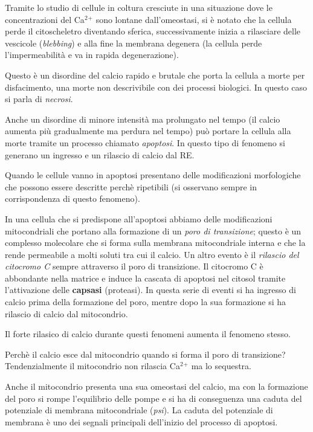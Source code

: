 \documentclass[]{article}
\begin{document}
Tramite lo studio di cellule in coltura cresciute in una situazione dove
le concentrazioni del Ca\(^2\)\(^+\) sono lontane dall'omeostasi, si è
notato che la cellula perde il citoscheletro diventando sferica,
successivamente inizia a rilasciare delle vescicole (\emph{blebbing}) e
alla fine la membrana degenera (la cellula perde l'impermeabilità e va
in rapida degenerazione).

Questo è un disordine del calcio rapido e brutale che porta la cellula a
morte per disfacimento, una morte non descrivibile con dei processi
biologici. In questo caso si parla di \emph{necrosi}.

Anche un disordine di minore intensità ma prolungato nel tempo (il
calcio aumenta più gradualmente ma perdura nel tempo) può portare la
cellula alla morte tramite un processo chiamato \emph{apoptosi}. In
questo tipo di fenomeno si generano un ingresso e un rilascio di calcio
dal RE.

Quando le cellule vanno in apoptosi presentano delle modificazioni
morfologiche che possono essere descritte perchè ripetibili (si
osservano sempre in corrispondenza di questo fenomeno).

In una cellula che si predispone all'apoptosi abbiamo delle
modificazioni mitocondriali che portano alla formazione di un \emph{poro
di transizione}; questo è un complesso molecolare che si forma sulla
membrana mitocondriale interna e che la rende permeabile a molti soluti
tra cui il calcio. Un altro evento è il \emph{rilascio del citocromo C}
sempre attraverso il poro di transizione. Il citocromo C è abbondante
nella matrice e induce la cascata di apoptosi nel citosol tramite
l'attivazione delle \textbf{capsasi} (proteasi). In questa serie di
eventi si ha ingresso di calcio prima della formazione del poro, mentre
dopo la sua formazione si ha rilascio di calcio dal mitocondrio.

Il forte rilasico di calcio durante questi fenomeni aumenta il fenomeno
stesso.

Perchè il calcio esce dal mitocondrio quando si forma il poro di
transizione? Tendenzialmente il mitocondrio non rilascia Ca\(^2\)\(^+\)
ma lo sequestra.

Anche il mitocondrio presenta una sua omeostasi del calcio, ma con la
formazione del poro si rompe l'equilibrio delle pompe e si ha di
conseguenza una caduta del potenziale di membrana mitocondriale
(\emph{psi}). La caduta del potenziale di membrana è uno dei segnali
principali dell'inizio del processo di apoptosi.
\end{document}
